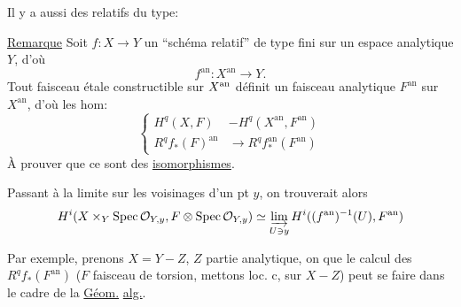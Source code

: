 Il y a aussi des  relatifs du type:

\uline{Remarque} Soit $f:X\to Y$ un ``schéma relatif'' de type fini sur un espace analytique $Y$, d'où
\[
f^{\mathrm{an}}:X^{\mathrm{an}}\longrightarrow Y.
\]
Tout faisceau étale constructible  sur $X^{\relax{\mathrm{an}}}$ définit un faisceau analytique $F^{\mathrm{an}}$ sur $X^{\mathrm{an}}$, d'où les hom:
\[
\left\{\begin{aligned}
H^q(X,F)&-H^q(X^{\mathrm{an}},F^{\mathrm{an}})\\
R^qf_*(F)^{\mathrm{an}}&\longrightarrow R^qf_*^{\mathrm{an}}(F^{\mathrm{an}})
\end{aligned}\right.
\]
À prouver que ce sont des \uline{isomorphismes}.


\uline{} Passant à la limite sur les voisinages d'un pt $y$, on trouverait alors
\[
H^{\relax{i}}(X\times_Y\operatorname{Spec}\mathcal O_{Y,y},F\otimes\operatorname{Spec}\mathcal O_{Y,y})
\simeq\varinjlim_{U\ni y}H^{\relax{i}}((f^{\mathrm{an}})^{-1}(U),F^{\mathrm{an}})
\]

Par exemple, prenons $X=Y-Z$, $Z$ partie analytique, on  que le calcul des $R^qf_*(F^{\mathrm{an}})$ ($F$ faisceau de torsion, mettons loc. c, sur $X-Z$)  peut se faire dans le cadre de la \uline{Géom.} \uline{alg.}.
